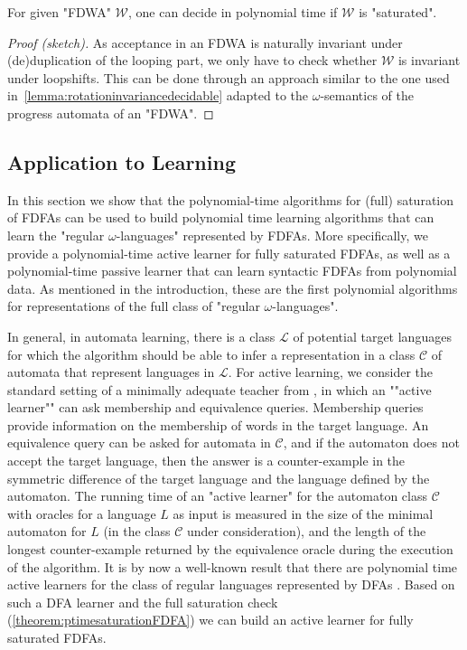 \documentclass[a4paper,USenglish,cleveref,autoref,thm-restate]{lipics-v2021}
\newcommand{\mc}[1]{\ensuremath{\mathcal{#1}}}
\newcommand{\C}{\mc{C}}
\renewcommand{\L}{\mc{L}}
\newcommand{\W}{\mc{W}}
\begin{document}
\begin{theorem}
  For given "FDWA" $\W$, one can decide in polynomial time if $\W$ is "saturated".
  \label{theorem:ptimesaturationFDWA}
\end{theorem}
\begin{proof}[Proof (sketch)]
As acceptance in an FDWA is naturally invariant under (de)duplication of the looping part, we only have to check whether $\W$ is invariant under loopshifts.
This can be done through an approach similar to the one used in~\cref{lemma:rotationinvariancedecidable} adapted to the $\omega$-semantics of the progress automata of an "FDWA".
\end{proof} \subsection{Application to Learning}\label{sec:learning}
In this section we show that the polynomial-time algorithms for (full) saturation of FDFAs can be used to build polynomial time learning algorithms that can learn the "regular $\omega$-languages" represented by FDFAs.
More specifically, we provide a polynomial-time active learner for fully saturated FDFAs, as well as a polynomial-time passive learner that can learn syntactic FDFAs from polynomial data.
As mentioned in the introduction, these are the first polynomial algorithms for representations of the full class of "regular $\omega$-languages".

In general, in automata learning, there is a class $\L$ of potential target languages for which the algorithm should be able to infer a representation in a class $\C$ of automata that represent languages in $\L$. 
\AP
For active learning, we consider the standard setting of a minimally adequate teacher from \cite{Angluin87}, in which an ""active learner"" can ask membership and equivalence queries. 
Membership queries provide information on the membership of words in the target language. An equivalence query can be asked for automata in $\C$, and if the automaton does not accept the target language, then the answer is a counter-example in the symmetric difference of the target language and the language defined by the automaton.
The running time of an "active learner" for the automaton class $\C$ with oracles for a language $L$ as input is measured in the size of the minimal automaton for $L$ (in the class $\C$ under consideration), and the length of the longest counter-example returned by the equivalence oracle during the execution of the algorithm. 
It is by now a well-known result that there are polynomial time active learners for the class of regular languages represented by DFAs \cite{Angluin87,RivestS93,KearnsV94}. Based on such a DFA learner and the full saturation check (\cref{theorem:ptimesaturationFDFA}) we can build an active learner for fully saturated FDFAs.
\end{document}
